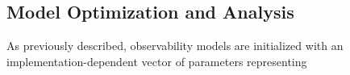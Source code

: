 \subsection{Model Optimization and Analysis}

As previously described, observability models are initialized with an implementation-dependent vector of parameters representing 

\subsubsection{}